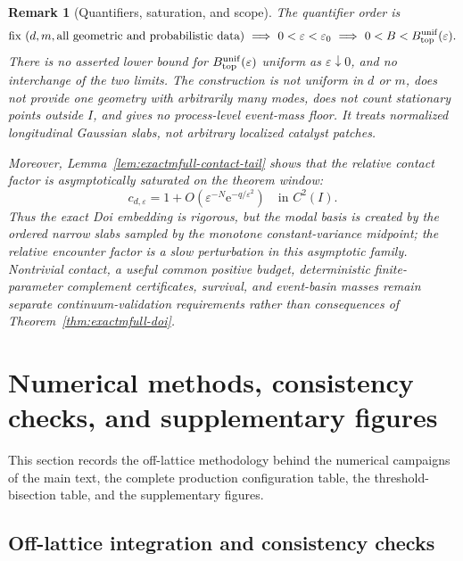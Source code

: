 \documentclass[aps,physrev,onecolumn,amsmath,amssymb,longbibliography]{revtex4-2}
\newcommand{\e}{\mathrm e}
\newtheorem{remark}[theorem]{Remark}
\begin{document}
\begin{remark}[Quantifiers, saturation, and scope]
\label{rem:exactmfull-scope}
The quantifier order is
\begin{equation}
 \text{fix }(d,m,\text{all geometric and probabilistic data})
 \ \Longrightarrow\ 
 0<\varepsilon<\varepsilon_0
 \ \Longrightarrow\ 
 0<B<B_{\rm top}^{\rm unif}(\varepsilon).
 \label{eq:exactmfull-quantifier-order}
\end{equation}
There is no asserted lower bound for
\(B_{\rm top}^{\rm unif}(\varepsilon)\) uniform as
\(\varepsilon\downarrow0\), and no interchange of the two limits.  The
construction is not uniform in \(d\) or \(m\), does not provide one geometry
with arbitrarily many modes, does not count stationary points outside \(I\),
and gives no process-level event-mass floor.  It treats normalized
longitudinal Gaussian slabs, not arbitrary localized catalyst patches.

Moreover, Lemma~\ref{lem:exactmfull-contact-tail} shows that the relative
contact factor is asymptotically saturated on the theorem window:
\begin{equation}
 c_{d,\varepsilon}=1
 +O(\varepsilon^{-N}\e^{-q/\varepsilon^2})
 \quad\text{in }C^2(I).
 \label{eq:exactmfull-saturated-contact}
\end{equation}
Thus the exact Doi embedding is rigorous, but the modal basis is created by
the ordered narrow slabs sampled by the monotone constant-variance midpoint;
the relative encounter factor is a slow perturbation in this asymptotic
family.  Nontrivial contact, a useful common positive budget, deterministic
finite-parameter complement certificates, survival, and event-basin masses
remain separate continuum-validation requirements rather than consequences
of Theorem~\ref{thm:exactmfull-doi}.
\end{remark}



\section{Numerical methods, consistency checks, and supplementary figures}
\label{sec:supp-numerics}

This section records the off-lattice methodology behind the numerical
campaigns of the main text, the complete production configuration table,
the threshold-bisection table, and the supplementary figures.

\subsection{Off-lattice integration and consistency checks}
\label{sec:supp-numerics-method}
\end{document}
